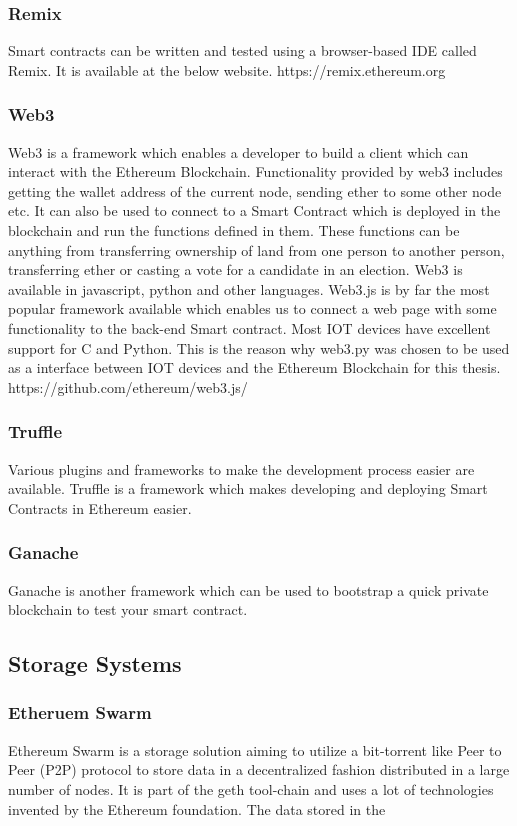 \documentclass[11pt,openright]{report}
\begin{document}
\subsubsection{Remix}
Smart contracts can be written and tested using a browser-based IDE called Remix. It is available at the below website.
https://remix.ethereum.org

\subsubsection{Web3}
Web3 is a framework which enables a developer to build a client which can interact with the Ethereum Blockchain. Functionality provided by web3 includes getting the wallet address of the current node, sending ether to some other node etc. It can also be used to connect to a Smart Contract which is deployed in the blockchain and run the functions defined in them. These functions can be anything from transferring ownership of land from one person to another person, transferring ether or casting a vote for a candidate in an election. Web3 is available in javascript, python and other languages. Web3.js is by far the most popular framework available which enables us to connect a web page with some functionality to the back-end Smart contract. Most IOT devices have excellent support for C and Python. This is the reason why web3.py was chosen to be used as a interface between IOT devices and the Ethereum Blockchain for this thesis.
https://github.com/ethereum/web3.js/

\subsubsection{Truffle}
Various plugins and frameworks to make the development process easier are available. Truffle is a framework which makes developing and deploying Smart Contracts in Ethereum easier.

\subsubsection{Ganache}
Ganache is another framework which can be used to bootstrap a quick private blockchain to test your smart contract.

\subsection{Storage Systems}
\subsubsection{Etheruem Swarm}
Ethereum Swarm is a storage solution aiming to utilize a bit-torrent like Peer to Peer (P2P) protocol to store data  in a decentralized fashion distributed in a large number of nodes. It is part of the geth tool-chain and uses a lot of technologies invented by the Ethereum foundation. The data stored in the  
\end{document}
